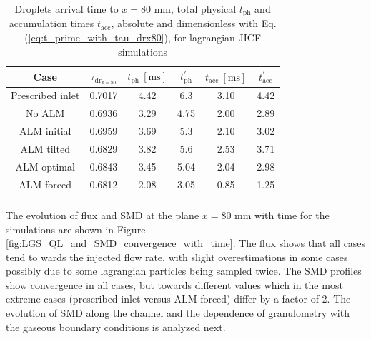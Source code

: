 \begin{table}[!h]
\centering
\caption{Droplets arrival time to $x = 80$ mm, total physical $t_\mathrm{ph}$ and accumulation times $t_\mathrm{acc}$, absolute and dimensionless with Eq. (\ref{eq:t_prime_with_tau_drx80}), for lagrangian JICF simulations}
\begin{tabular}{cccccc}
\thickhline
\textbf{Case} & $\tau_\mathrm{dr_{x=80}}$ & $t_\mathrm{ph}~[\mathrm{ms}]$ &  $t_\mathrm{ph}^{\prime}$ & $t_\mathrm{acc}~[\mathrm{ms}]$  & $t_\mathrm{acc}^{\prime}$  \\
\hline
Prescribed inlet & 0.7017 & 4.42 & 6.3 & 3.10 & 4.42 \\
No ALM & 0.6936 & 3.29 & 4.75 & 2.00 & 2.89 \\
ALM initial & 0.6959 & 3.69 & 5.3 & 2.10 & 3.02 \\
ALM tilted & 0.6829 & 3.82 & 5.6 & 2.53 & 3.71 \\
ALM optimal & 0.6843 & 3.45 & 5.04 & 2.04 & 2.98 \\
ALM forced  & 0.6812 & 2.08 & 3.05 & 0.85 & 1.25 \\
\thickhline
\end{tabular}
\label{tab:jicf_LGS_t_prime_accumulation}
\end{table}

	The evolution of flux and SMD at the plane $x = 80$ mm with time for the simulations are shown in Figure \ref{fig:LGS_QL_and_SMD_convergence_with_time}. The flux shows that all cases tend to wards the injected flow rate, with slight overestimations in some cases possibly due to some lagrangian particles being sampled twice. The SMD profiles show convergence in all cases, but towards different values which in the most extreme cases (prescribed inlet versus ALM forced) differ by a factor of 2. The evolution of SMD along the channel and the dependence of granulometry with the gaseous boundary conditions is analyzed next.
	
\clearpage

